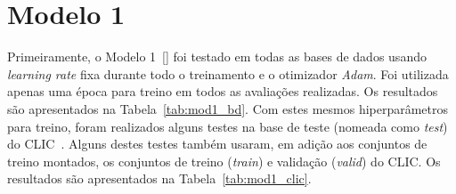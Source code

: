 \section{Modelo 1}
\label{res:mod1}
Primeiramente, o Modelo 1~[] foi testado em todas as bases de dados usando \textit{learning rate} fixa durante todo o treinamento e o otimizador \textit{Adam}. Foi utilizada apenas uma época para treino em todos as avaliações realizadas. Os resultados são apresentados na Tabela~\ref{tab:mod1_bd}. Com estes mesmos hiperparâmetros para treino, foram realizados alguns testes na base de teste (nomeada como \textit{test}) do \acrshort{CLIC}~\cite{clic}. Alguns destes testes também usaram, em adição aos conjuntos de treino montados, os conjuntos de treino (\textit{train}) e validação (\textit{valid}) do \acrshort{CLIC}. Os resultados são apresentados na Tabela~\ref{tab:mod1_clic}.

